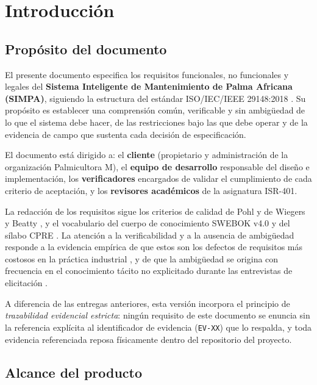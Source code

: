 \documentclass[11pt,a4paper]{article}
\newcommand{\id}[1]{\texttt{\begingroup\hyphenpenalty=10000\relax#1\endgroup}}
\renewcommand{\id}[1]{\texttt{#1}}
\begin{document}
\section{Introducción}

\subsection{Propósito del documento}

El presente documento especifica los requisitos funcionales, no funcionales y legales del
\textbf{Sistema Inteligente de Mantenimiento de Palma Africana (SIMPA)}, siguiendo la estructura
del estándar ISO/IEC/IEEE 29148:2018 \cite{iso29148}. Su propósito es establecer una comprensión
común, verificable y sin ambigüedad de lo que el sistema debe hacer, de las restricciones bajo las
que debe operar y de la evidencia de campo que sustenta cada decisión de especificación.

El documento está dirigido a: el \textbf{cliente} (propietario y administración de la organización
Palmicultora M), el \textbf{equipo de desarrollo} responsable del diseño e implementación, los
\textbf{verificadores} encargados de validar el cumplimiento de cada criterio de aceptación, y los
\textbf{revisores académicos} de la asignatura ISR-401.

La redacción de los requisitos sigue los criterios de calidad de Pohl \cite{pohl2010} y de Wiegers y
Beatty \cite{wiegers2013}, y el vocabulario del cuerpo de conocimiento SWEBOK v4.0 \cite{swebok4} y
del sílabo CPRE \cite{ireb2023}. La atención a la verificabilidad y a la ausencia de ambigüedad
responde a la evidencia empírica de que estos son los defectos de requisitos más costosos en la
práctica industrial \cite{mendez2017,montgomery2022}, y de que la ambigüedad se origina con
frecuencia en el conocimiento tácito no explicitado durante las entrevistas de elicitación
\cite{ferrari2016}.

A diferencia de las entregas anteriores, esta versión incorpora el principio de \emph{trazabilidad
evidencial estricta}: ningún requisito de este documento se enuncia sin la referencia explícita al
identificador de evidencia (\id{EV-XX}) que lo respalda, y toda evidencia referenciada reposa
físicamente dentro del repositorio del proyecto.

\subsection{Alcance del producto}
\end{document}
